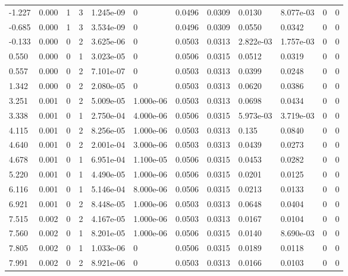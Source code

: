 \documentclass[preview]{standalone}
\begin{document}
{{\begin{tabular}{L{1.2cm}C{1.2cm} C{0.3cm}C{0.5cm} C{1.4cm}C{1.4cm} C{1.4cm}C{1.4cm} C{1.6cm}C{1.6cm} C{1.6cm}C{1.6cm}}
  -1.227  &  0.000  & 1     &  3 &  1.245e-09  & 0  &  0.0496&   0.0309& 0.0130 & 8.077e-03   &  0 & 0  \\ 
  -0.685  &  0.000  & 1     &  3 &  3.534e-09  & 0  &  0.0496&   0.0309& 0.0550 & 0.0342   &  0 & 0  \\ 
  -0.133  &  0.000  & 0     &  2 &  3.625e-06  & 0  &  0.0503&   0.0313& 2.822e-03 & 1.757e-03   &  0 & 0  \\ 
  0.550  &  0.000  & 0     &  1 &  3.023e-05  & 0  &  0.0506&   0.0315& 0.0512 & 0.0319   &  0 & 0  \\ 
  0.557  &  0.000  & 0     &  2 &  7.101e-07  & 0  &  0.0503&   0.0313& 0.0399 & 0.0248   &  0 & 0  \\ 
  1.342  &  0.000  & 0     &  2 &  2.080e-05  & 0  &  0.0503&   0.0313& 0.0620 & 0.0386   &  0 & 0  \\ 
  3.251  &  0.001  & 0     &  2 &  5.009e-05  & 1.000e-06  &  0.0503&   0.0313& 0.0698 & 0.0434   &  0 & 0  \\ 
  3.338  &  0.001  & 0     &  1 &  2.750e-04  & 4.000e-06  &  0.0506&   0.0315& 5.973e-03 & 3.719e-03   &  0 & 0  \\ 
  4.115  &  0.001  & 0     &  2 &  8.256e-05  & 1.000e-06  &  0.0503&   0.0313& 0.135 & 0.0840   &  0 & 0  \\ 
  4.640  &  0.001  & 0     &  2 &  2.001e-04  & 3.000e-06  &  0.0503&   0.0313& 0.0439 & 0.0273   &  0 & 0  \\ 
  4.678  &  0.001  & 0     &  1 &  6.951e-04  & 1.100e-05  &  0.0506&   0.0315& 0.0453 & 0.0282   &  0 & 0  \\ 
  5.220  &  0.001  & 0     &  1 &  4.490e-05  & 1.000e-06  &  0.0506&   0.0315& 0.0201 & 0.0125   &  0 & 0  \\ 
  6.116  &  0.001  & 0     &  1 &  5.146e-04  & 8.000e-06  &  0.0506&   0.0315& 0.0213 & 0.0133   &  0 & 0  \\ 
  6.921  &  0.001  & 0     &  2 &  8.448e-05  & 1.000e-06  &  0.0503&   0.0313& 0.0648 & 0.0404   &  0 & 0  \\ 
  7.515  &  0.002  & 0     &  2 &  4.167e-05  & 1.000e-06  &  0.0503&   0.0313& 0.0167 & 0.0104   &  0 & 0  \\ 
  7.560  &  0.002  & 0     &  1 &  8.201e-05  & 1.000e-06  &  0.0506&   0.0315& 0.0140 & 8.690e-03   &  0 & 0  \\ 
  7.805  &  0.002  & 0     &  1 &  1.033e-06  & 0  &  0.0506&   0.0315& 0.0189 & 0.0118   &  0 & 0  \\ 
  7.991  &  0.002  & 0     &  2 &  8.921e-06  & 0  &  0.0503&   0.0313& 0.0166 & 0.0103   &  0 & 0  \\ 

\end{tabular}}}
\end{document}
